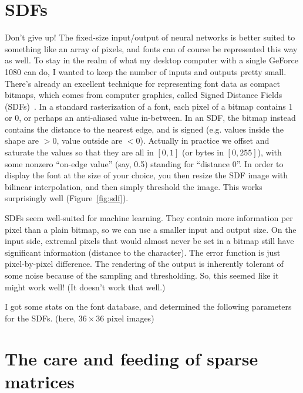 \documentclass[twocolumn]{amsart}
\begin{document}




\section{SDFs}

Don't give up! The fixed-size input/output of neural networks is
better suited to something like an array of pixels, and fonts can of
course be represented this way as well. To stay in the realm of what
my desktop computer with a single GeForce 1080 can do, I wanted to
keep the number of inputs and outputs pretty small. There's already an
excellent technique for representing font data as compact bitmaps,
which comes from computer graphics, called Signed Distance Fields
(SDFs)~\cite{green2007improved}. In a standard rasterization of a
font, each pixel of a bitmap contains 1 or 0, or perhaps an
anti-aliased value in-between. In an SDF, the bitmap instead contains
the distance to the nearest edge, and is signed (e.g. values inside
the shape are $> 0$, value outside are $< 0$). Actually in
practice we offset and saturate the values so that they are all in
$[0,1]$ (or bytes in $[0,255]$), with some nonzero ``on-edge value''
(say, 0.5) standing for ``distance 0''. In order to display the font
at the size of your choice, you then resize the SDF image with bilinear
interpolation, and then simply threshold the image. This works
surprisingly well (Figure~\ref{fig:sdf}).

SDFs seem well-suited for machine learning. They contain more
information per pixel than a plain bitmap, so we can use a smaller
input and output size. On the input
side, extremal pixels that would almost never be set in a bitmap still
have significant information (distance to the character). The error
function is just pixel-by-pixel difference. The rendering of the
output is inherently tolerant of some noise because of the sampling
and thresholding. So, this seemed like it might work well! (It doesn't
work that well.)

I got some stats on the font database, and determined the following
parameters for the SDFs.
 (here, $36\times36$ pixel images)

\section{The care and feeding of sparse matrices} \label{sec:neural}
\end{document}
